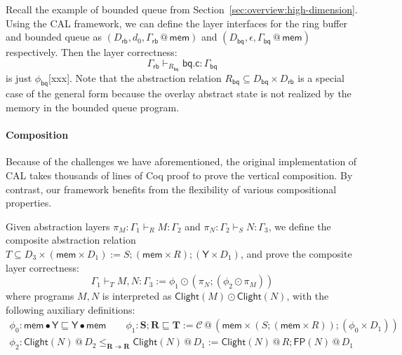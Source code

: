 \documentclass[acmsmall,screen,review,anonymous]{acmart}
\newcommand{\kw}[1]{\ensuremath{ \mathsf{#1} }}
\newcommand{\jr}{\mathsf{Y}}
\begin{document}
\begin{example}
  Recall the example of bounded queue
  from Section~\ref{sec:overview:high-dimension}.
  Using the CAL framework,
  we can define the layer interfaces
  for the ring buffer and bounded queue as
  $(D_\kw{rb}, d_0, \Gamma_\kw{rb}\mathbin@ \kw{mem})$ and
  $(D_\kw{bq}, \epsilon, \Gamma_\kw{bq}\mathbin@ \kw{mem})$ respectively.
  Then the layer correctness:
  \[
    \Gamma_\kw{rb} \vdash_{R_\kw{bq}} \kw{bq.c} : \Gamma_\kw{bq}
  \]
  is just $\phi_\kw{bq}$[xxx].
  Note that the abstraction relation
  $R_\kw{bq} \subseteq D_\kw{bq} \times D_\kw{rb}$
  is a special case of the general form
  because the overlay abstract state
  is not realized
  by the memory in the bounded queue program.
\end{example}

\paragraph{Composition}
Because of the challenges
we have aforementioned,
the original implementation of CAL takes
thousands of lines of Coq proof
to prove the vertical composition.
By contrast,
our framework benefits from the flexibility
of various compositional properties.

Given abstraction layers
$\pi_M: \Gamma_1 \vdash_R M : \Gamma_2$
and
$\pi_N: \Gamma_2 \vdash_S N : \Gamma_3$,
we define the composite abstraction relation
$T \subseteq D_3 \times (\kw{mem} \times D_1) := S \mathbin; (\kw{mem} \times R) \mathbin; (\jr \times D_1) $,
and prove the composite layer correctness:
\[
  \Gamma_1 \vdash_T M, N : \Gamma_3 := \phi_1 \odot (\pi_N \mathbin; (\phi_2 \odot \pi_M))
\]
where programs $M, N$ is interpreted as
$\kw{Clight}(M) \odot \kw{Clight}(N)$,
with the following auxiliary definitions:
\[
  \begin{array}{c}
    \phi_0: \kw{mem} \bullet \jr \sqsubseteq \jr \bullet \kw{mem}
    \qquad \phi_1: \mathbf{S} \mathbin; \mathbf{R} \sqsubseteq \mathbf{T}
    := \mathcal{C} \mathbin@ (\kw{mem} \times (S \mathbin; (\kw{mem} \times R))\mathbin; (\phi_0 \times D_1) )
    \\
    \phi_2: \kw{Clight}(N) \mathbin@ D_2 \le_{\mathbf{R} \twoheadrightarrow \mathbf{R}}
    \kw{Clight}(N) \mathbin@ D_1
    := \kw{Clight}(N) \mathbin@ R \mathbin; \kw{FP}(N) \mathbin@ D_1
  \end{array}
\]
\end{document}
